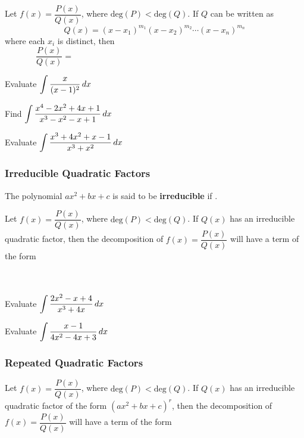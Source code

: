 \documentclass[notes]{subfiles}
\begin{document}
		\begin{rmk}
			Let $f(x) = \dfrac{P(x)}{Q(x)}$, where $\text{deg}(P) < \text{deg}(Q)$.  If $Q$ can be written as
				\[Q(x) =(x-x_1)^{m_1}(x-x_2)^{m_2}\cdots (x-x_n)^{m_n}\]
			where each $x_i$ is distinct, then
				\[\dfrac{P(x)}{Q(x)} = \hspace{4in}\]
		\end{rmk}
		\begin{ex}
			Evaluate $\displaystyle \int \dfrac{x}{(x-1)^2}\, dx$
		\end{ex}
			\newpage
			
		\begin{ex}
			Find $\displaystyle \int \dfrac{x^4-2x^2+4x+1}{x^3-x^2-x+1}\, dx$
		\end{ex}
			
		\begin{ex}
			Evaluate $\displaystyle \int \dfrac{x^3+4x^2+x-1}{x^3+x^2}\, dx$
		\end{ex}
			\newpage
			
	\subsubsection*{Irreducible Quadratic Factors}
		\begin{defn}
			The polynomial $ax^2 + bx + c$ is said to be \textbf{irreducible} if .
		\end{defn}
		\begin{rmk}
			Let $f(x) = \dfrac{P(x)}{Q(x)}$, where $\text{deg}(P) < \text{deg}(Q)$.  If $Q(x)$ has an irreducible quadratic factor, then the decomposition of $f(x) = \dfrac{P(x)}{Q(x)}$ will have a term of the form
			\\ \\ \\
		\end{rmk}
		\begin{ex}
			Evaluate $\displaystyle \int \dfrac{2x^2-x+4}{x^3 + 4x}\, dx$
		\end{ex}
			\newpage
			
		\begin{ex}
			Evaluate $\displaystyle \int \dfrac{x-1}{4x^2-4x+3}\, dx$
		\end{ex}
			\newpage
			
	\subsubsection*{Repeated Quadratic Factors}
		\begin{rmk}
			Let $f(x) = \dfrac{P(x)}{Q(x)}$, where $\text{deg}(P) < \text{deg}(Q)$.  If $Q(x)$ has an irreducible quadratic factor of the form $(ax^2 + bx + c)^r$, then the decomposition of $f(x) = \dfrac{P(x)}{Q(x)}$ will have a term of the form \\ \\ \\
		\end{rmk}
		
\end{document}
